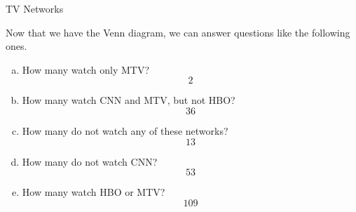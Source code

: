 \begin{example}{TV Networks}
\begin{center}
\end{center}

Now that we have the Venn diagram, we can answer questions like the following ones.

\begin{enumerate}[(a)]
\item How many watch only MTV?
\[\boxed{2}\]
\item How many watch CNN and MTV, but not HBO?
\[\boxed{36}\]
\item How many do not watch any of these networks?
\[\boxed{13}\]
\item How many do not watch CNN?
\[\boxed{53}\]
\item How many watch HBO or MTV?
\[\boxed{109}\]
\end{enumerate}

\end{example}

